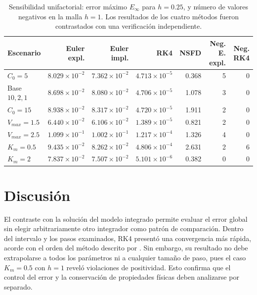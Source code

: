 \documentclass[11pt,final,5p,times,twocolumn,authoryear]{elsarticle}
\begin{document}
\begin{table}[t]
\centering
\caption{Sensibilidad unifactorial: error máximo $E_\infty$ para $h=0.25$, y número de valores negativos en la malla $h=1$. Los resultados de los cuatro métodos fueron contrastados con una verificación independiente.}
\label{tab:sensibilidad}
\small
\begin{tabular}{@{}lrrrrrr@{}}
\toprule
Escenario & Euler expl. & Euler impl. & RK4 & NSFD & Neg. E. expl. & Neg. RK4 \\
\midrule
$C_0=5$        & $8.029\!\times\!10^{-2}$ & $7.362\!\times\!10^{-2}$ & $4.713\!\times\!10^{-5}$ & 0.368 & 5 & 0 \\
Base $10,2,1$  & $8.698\!\times\!10^{-2}$ & $8.080\!\times\!10^{-2}$ & $4.706\!\times\!10^{-5}$ & 1.078 & 3 & 0 \\
$C_0=15$       & $8.938\!\times\!10^{-2}$ & $8.317\!\times\!10^{-2}$ & $4.720\!\times\!10^{-5}$ & 1.911 & 2 & 0 \\
$V_{max}=1.5$  & $6.440\!\times\!10^{-2}$ & $6.106\!\times\!10^{-2}$ & $1.389\!\times\!10^{-5}$ & 0.821 & 2 & 0 \\
$V_{max}=2.5$  & $1.099\!\times\!10^{-1}$ & $1.002\!\times\!10^{-1}$ & $1.217\!\times\!10^{-4}$ & 1.326 & 4 & 0 \\
$K_m=0.5$      & $9.435\!\times\!10^{-2}$ & $8.262\!\times\!10^{-2}$ & $4.806\!\times\!10^{-4}$ & 2.631 & 2 & 6 \\
$K_m=2$        & $7.837\!\times\!10^{-2}$ & $7.507\!\times\!10^{-2}$ & $5.101\!\times\!10^{-6}$ & 0.382 & 0 & 0 \\
\bottomrule
\end{tabular}
\end{table}

\section{Discusión}
\label{discusion}

El contraste con la solución del modelo integrado permite evaluar el error global sin elegir arbitrariamente otro integrador como patrón de comparación. Dentro del intervalo y los pasos examinados, RK4 presentó una convergencia más rápida, acorde con el orden del método descrito por \citet{butcher1996}. Sin embargo, su resultado no debe extrapolarse a todos los parámetros ni a cualquier tamaño de paso, pues el caso $K_m=0.5$ con $h=1$ reveló violaciones de positividad. Esto confirma que el control del error y la conservación de propiedades físicas deben analizarse por separado.
\end{document}
